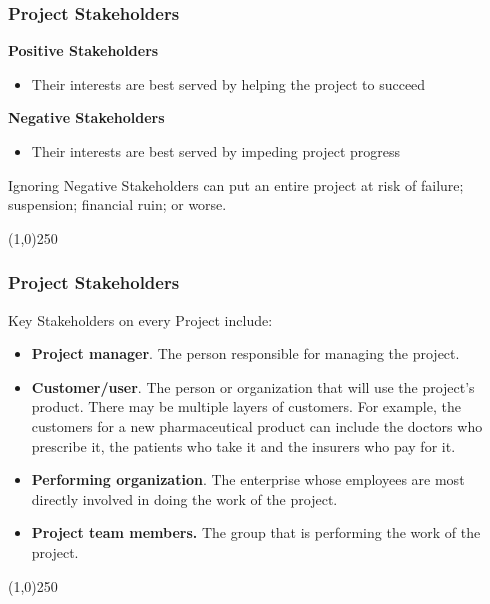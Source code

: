 \begin{frame}
\frametitle{Project Stakeholders}
\textbf{Positive Stakeholders}\\
\begin{itemize}
	\item Their interests are best served by helping the project to succeed
\end{itemize}
\textbf{Negative Stakeholders}\\
\begin{itemize}
	\item Their interests are best served by impeding project progress
\end{itemize}
Ignoring Negative Stakeholders can put an entire project at risk of failure; suspension; financial ruin; or worse.\\
\end{frame}
\begin{center}\line(1,0){250}\end{center}



\begin{frame}
\frametitle{Project Stakeholders}
Key Stakeholders on every Project include:\\
\begin{itemize}
	\item \textbf{Project manager}. The person responsible for managing the project. 
	\item \textbf{Customer/user}. The person or organization that will use the project's product. There may be multiple layers of customers. For example, the customers for a new pharmaceutical product can include the doctors who prescribe it, the patients who take it and the insurers who pay for it.
	\item \textbf{Performing organization}. The enterprise whose employees are most directly involved in doing the work of the project. 
	\item \textbf{Project team members.} The group that is performing the work of the project. 
\end{itemize}
\end{frame}
\begin{center}\line(1,0){250}\end{center}


